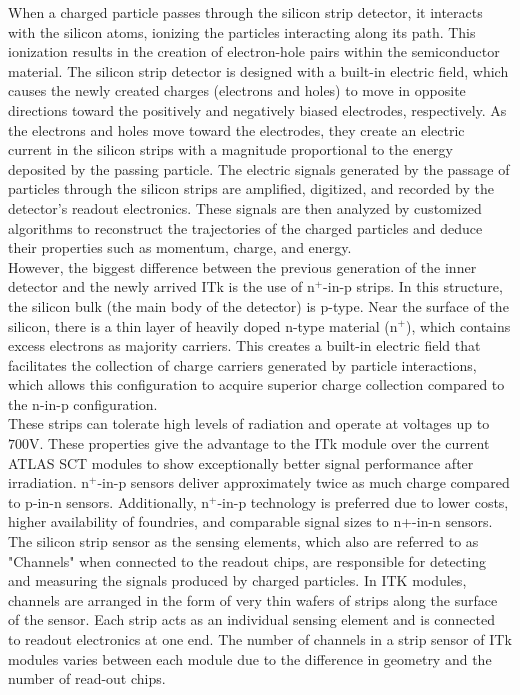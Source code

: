 When a charged particle passes through the silicon strip detector, it interacts with the silicon atoms, ionizing the particles interacting along its path. This ionization results in the creation of electron-hole pairs within the semiconductor material. The silicon strip detector is designed with a built-in electric field, which causes the newly created charges (electrons and holes) to move in opposite directions toward the positively and negatively biased electrodes, respectively. As the electrons and holes move toward the electrodes, they create an electric current in the silicon strips with a magnitude proportional to the energy deposited by the passing particle. The electric signals generated by the passage of particles through the silicon strips are amplified, digitized, and recorded by the detector's readout electronics. These signals are then analyzed by customized algorithms to reconstruct the trajectories of the charged particles and deduce their properties such as momentum, charge, and energy.\\

However, the biggest difference between the previous generation of the inner detector and the newly arrived ITk is the use of n$^+$-in-p strips. In this structure, the silicon bulk (the main body of the detector) is p-type. Near the surface of the silicon, there is a thin layer of heavily doped n-type material (n$^+$), which contains excess electrons as majority carriers. This creates a built-in electric field that facilitates the collection of charge carriers generated by particle interactions, which allows this configuration to acquire superior charge collection compared to the n-in-p configuration.\\

These strips can tolerate high levels of radiation and operate at voltages up to $700 \si{\volt}$. These properties give the advantage to the ITk module over the current ATLAS SCT modules to show exceptionally better signal performance after irradiation. n$^+$-in-p sensors deliver approximately twice as much charge compared to p-in-n sensors. Additionally, n$^+$-in-p technology is preferred due to lower costs, higher availability of foundries, and comparable signal sizes to n+-in-n sensors\cite{UNNO2013183}.\\

The silicon strip sensor as the sensing elements, which also are referred to as "Channels" when connected to the readout chips, are responsible for detecting and measuring the signals produced by charged particles. In ITK modules, channels are arranged in the form of very thin wafers of strips along the surface of the sensor. Each strip acts as an individual sensing element and is connected to readout electronics at one end. The number of channels in a strip sensor of ITk modules varies between each module due to the difference in geometry and the number of read-out chips.\\

